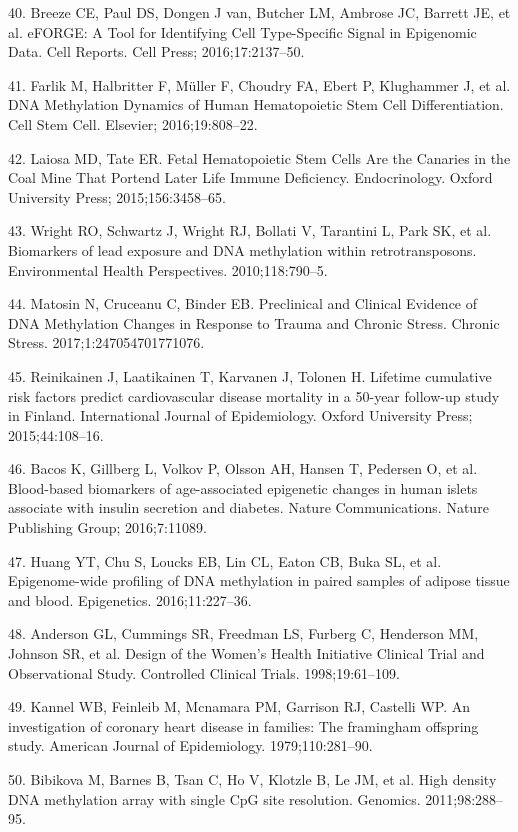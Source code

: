 \documentclass[]{bmcart}
\theoremstyle{definition}
\theoremstyle{definition}
\theoremstyle{definition}
\theoremstyle{remark}
\begin{document}
40. Breeze CE, Paul DS, Dongen J van, Butcher LM, Ambrose JC, Barrett
JE, et al. eFORGE: A Tool for Identifying Cell Type-Specific Signal in
Epigenomic Data. Cell Reports. Cell Press; 2016;17:2137--50.

41. Farlik M, Halbritter F, M{ü}ller F, Choudry FA, Ebert P, Klughammer
J, et al. DNA Methylation Dynamics of Human Hematopoietic Stem Cell
Differentiation. Cell Stem Cell. Elsevier; 2016;19:808--22.

42. Laiosa MD, Tate ER. Fetal Hematopoietic Stem Cells Are the Canaries
in the Coal Mine That Portend Later Life Immune Deficiency.
Endocrinology. Oxford University Press; 2015;156:3458--65.

43. Wright RO, Schwartz J, Wright RJ, Bollati V, Tarantini L, Park SK,
et al. Biomarkers of lead exposure and DNA methylation within
retrotransposons. Environmental Health Perspectives. 2010;118:790--5.

44. Matosin N, Cruceanu C, Binder EB. Preclinical and Clinical Evidence
of DNA Methylation Changes in Response to Trauma and Chronic Stress.
Chronic Stress. 2017;1:247054701771076.

45. Reinikainen J, Laatikainen T, Karvanen J, Tolonen H. Lifetime
cumulative risk factors predict cardiovascular disease mortality in a
50-year follow-up study in Finland. International Journal of
Epidemiology. Oxford University Press; 2015;44:108--16.

46. Bacos K, Gillberg L, Volkov P, Olsson AH, Hansen T, Pedersen O, et
al. Blood-based biomarkers of age-associated epigenetic changes in human
islets associate with insulin secretion and diabetes. Nature
Communications. Nature Publishing Group; 2016;7:11089.

47. Huang YT, Chu S, Loucks EB, Lin CL, Eaton CB, Buka SL, et al.
Epigenome-wide profiling of DNA methylation in paired samples of adipose
tissue and blood. Epigenetics. 2016;11:227--36.

48. Anderson GL, Cummings SR, Freedman LS, Furberg C, Henderson MM,
Johnson SR, et al. Design of the Women's Health Initiative Clinical
Trial and Observational Study. Controlled Clinical Trials.
1998;19:61--109.

49. Kannel WB, Feinleib M, Mcnamara PM, Garrison RJ, Castelli WP. An
investigation of coronary heart disease in families: The framingham
offspring study. American Journal of Epidemiology. 1979;110:281--90.

50. Bibikova M, Barnes B, Tsan C, Ho V, Klotzle B, Le JM, et al. High
density DNA methylation array with single CpG site resolution. Genomics.
2011;98:288--95.
\end{document}
